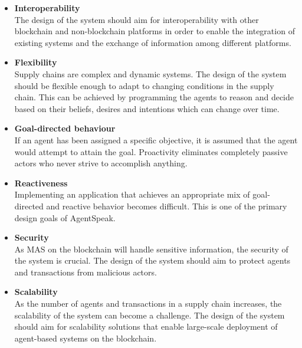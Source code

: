 \begin{itemize}
    \item \textbf{Interoperability} \\ The design of the system should aim for interoperability with other blockchain and non-blockchain platforms in order to enable the integration of existing systems and the exchange of information among different platforms.

    \vspace{.5cm}
    
    \item \textbf{Flexibility} \\
    Supply chains are complex and dynamic systems. The design of the system should be flexible enough to adapt to changing conditions in the supply chain. This can be achieved by programming the agents to reason and decide based on their beliefs, desires and intentions which can change over time.
    
    \vspace{.5cm}
    
    \item \textbf{Goal-directed behaviour} \\
    If an agent has been assigned a specific objective, it is assumed that the agent would attempt to attain the goal. Proactivity eliminates completely passive actors who never strive to accomplish anything.

    \vspace{.5cm}
    
    \item \textbf{Reactiveness} \\
    Implementing an application that achieves an appropriate mix of goal-directed and reactive behavior becomes difficult. This is one of the primary design goals of AgentSpeak.
    
    \vspace{.5cm}
    
    \item \textbf{Security} \\
    As \ac{MAS} on the blockchain will handle sensitive information, the security of the system is crucial. The design of the system should aim to protect agents and transactions from malicious actors.

    \vspace{.5cm}
    
    \item \textbf{Scalability} \\ As the number of agents and transactions in a supply chain increases, the scalability of the system can become a challenge. The design of the system should aim for scalability solutions that enable large-scale deployment of agent-based systems on the blockchain.
\end{itemize}

